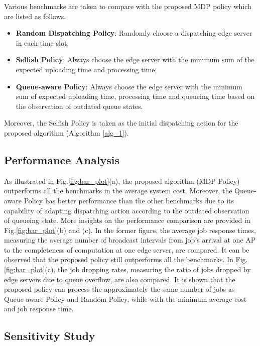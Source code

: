 Various benchmarks are taken to compare with the proposed MDP policy which are listed as follows.
\begin{itemize}
    \item \textbf{Random Dispatching Policy}:
            Randomly choose a dispatching edge server in each time slot; 
    \item \textbf{Selfish Policy}:
            Always choose the edge server with the minimum sum of the expected uploading time and processing time;
    \item \textbf{Queue-aware Policy}:
            Always choose the edge server with the minimum sum of expected uploading time, processing time and queueing time based on the observation of outdated queue states.
\end{itemize}
Moreover, the Selfish Policy is taken as the initial dispatching action for the proposed algorithm (Algorithm \ref{alg_1}).
\subsection{Performance Analysis}
\label{subsec:basic}
As illustrated in Fig.\ref{fig:bar_plot}(a), the proposed algorithm (MDP Policy) outperforms all the benchmarks in the average system cost.
Moreover, the Queue-aware Policy has better performance than the other benchmarks due to its capability of adapting dispatching action according to the outdated observation of queueing state.
More insights on the performance comparison are provided in Fig.\ref{fig:bar_plot}(b) and (c).
In the former figure, the average job response times, measuring the average number of broadcast intervals from job's arrival at one AP to the completeness of computation at one edge server, are compared.
It can be observed that the proposed policy still outperforms all the benchmarks.
In Fig.\ref{fig:bar_plot}(c), the job dropping rates, measuring the ratio of jobs dropped by edge servers due to queue overflow, are also compared.
It is shown that the proposed policy can process the approximately the same number of jobs as Queue-aware Policy and Random Policy, while with the minimum average cost and job response time.

\subsection{Sensitivity Study}
\label{subsec:advance}  

